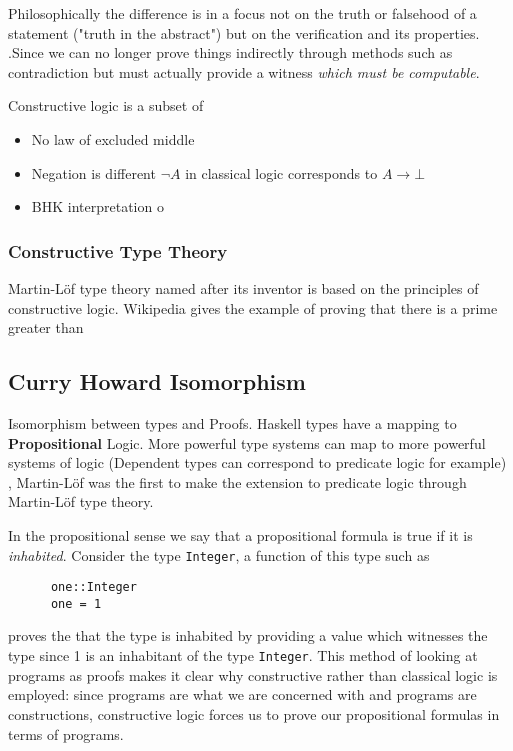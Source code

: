 \documentclass{article}
\begin{document}
  Philosophically the difference is in a focus not on the truth or falsehood of
  a statement ("truth in the abstract") but on the verification and its properties.
  .Since we can no longer prove things indirectly through methods such as
  contradiction but must actually provide a witness \textit{which must be computable}.
  

   Constructive logic is a subset of 
   
\begin{itemize}
  \item No law of excluded middle
  \item Negation is different $\lnot A$ in classical logic corresponds to
    $A \rightarrow \bot$
  \item BHK interpretation o
\end{itemize}

\subsubsection{Constructive Type Theory}
Martin-Löf type theory named after its inventor is based on the principles of constructive
logic. Wikipedia gives the example of proving that there is a prime greater than

\subsection{Curry Howard Isomorphism}

Isomorphism between types and Proofs. Haskell types have a mapping to
\textbf{Propositional} Logic. More powerful type systems can map to
more powerful systems of logic (Dependent types can correspond to predicate
logic for example) , Martin-Löf was the first to make the extension to predicate
logic through Martin-Löf type theory.
\bigskip

In the propositional sense we say that a propositional formula is true
if it is \textit{inhabited}. Consider the type \verb|Integer|, a function
of this type such as 
    \begin{verbatim}
      one::Integer
      one = 1
    \end{verbatim}
proves the that the type is inhabited
by providing a value which witnesses the type since 1 is an inhabitant of the
type \verb|Integer|. This method of looking at programs as proofs makes it clear why
constructive rather than classical logic is employed: since programs are what we are
concerned with and programs are constructions, constructive logic forces us to prove
our propositional formulas in terms of programs.
\end{document}

